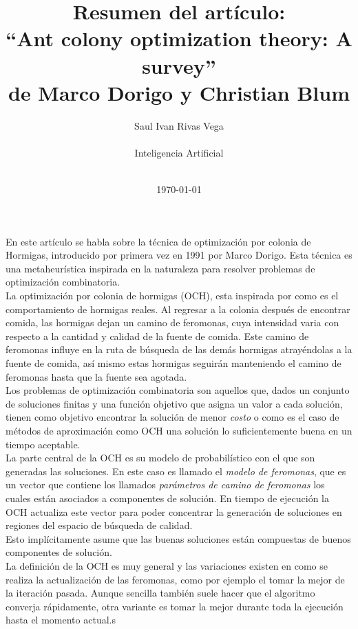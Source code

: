 \documentclass[12pt]{article}
\title{Resumen del artículo:\\ “Ant colony optimization theory: A survey” \\ de Marco Dorigo y Christian Blum}
\author{
	Saul Ivan Rivas Vega \\
	\\
	Inteligencia Artificial\\
\\
}
\date{\today}
\begin{document}
	\maketitle
	\pagebreak
	\paragraph{}
	En este artículo se habla sobre la técnica de optimización por colonia de Hormigas, introducido por primera vez en 1991 por Marco Dorigo. Esta técnica es una metaheurística inspirada en la naturaleza para resolver problemas de optimización combinatoria. \\
	La optimización por colonia de hormigas (OCH), esta inspirada por como es el comportamiento de hormigas reales. Al regresar a la colonia después de encontrar comida, las hormigas dejan un camino de feromonas, cuya intensidad varia con respecto a la cantidad y calidad de la fuente de comida. Este camino de feromonas influye en la ruta de búsqueda de las demás hormigas atrayéndolas a la fuente de comida, así mismo estas hormigas seguirán manteniendo el camino de feromonas hasta que la fuente sea agotada.\\
	Los problemas de optimización combinatoria son aquellos que, dados un conjunto de soluciones finitas y una función objetivo que asigna un valor a cada solución, tienen como objetivo encontrar la solución de menor \textit{costo} o como es el caso de métodos de aproximación como OCH una solución lo suficientemente buena en un tiempo aceptable.\\
	La parte central de la OCH es su modelo de probabilístico con el que son generadas las soluciones. En este caso es llamado el \textit{modelo de feromonas}, que es un vector que contiene los llamados \textit{parámetros de camino de feromonas} los cuales están asociados a componentes de solución. En tiempo de ejecución la OCH actualiza este vector para poder concentrar la generación de soluciones en regiones del espacio de búsqueda de calidad.\\
	Esto implícitamente asume que las buenas soluciones están compuestas de buenos componentes de solución.\\
	La definición de la OCH es muy general y las variaciones existen en como se realiza la actualización de las feromonas, como por ejemplo el tomar la mejor de la iteración pasada. Aunque sencilla también suele hacer que el algoritmo converja rápidamente, otra variante es tomar la mejor durante toda la ejecución hasta el momento actual.s \\\\
\end{document}
